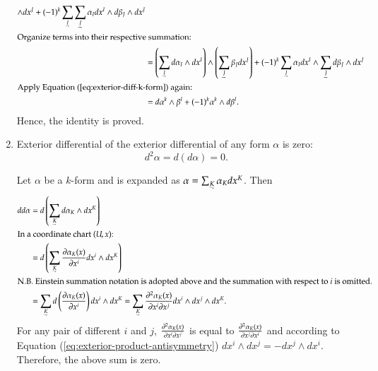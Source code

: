 \documentclass[11pt, a4paper]{book}
\begin{document}
\begin{enumerate}
\begin{Proof}
\begin{align*}
        \wedge dx^J + (-1)^k\sum_{\underaccent{\rightharpoondown}{I}}
        \sum_{\underaccent{\rightharpoondown}{J}} \alpha_Idx^I \wedge d\beta_J \wedge dx^J
      \\
      \intertext{Organize terms into their respective summation:}
      &= \left( \sum_{\underaccent{\rightharpoondown}{I}} d\alpha_I \wedge dx^I \right)
        \wedge \left( \sum_{\underaccent{\rightharpoondown}{J}} \beta_J dx^J \right) +
        (-1)^k \sum_{\underaccent{\rightharpoondown}{I}} \alpha_Idx^I \wedge
        \sum_{\underaccent{\rightharpoondown}{J}} d\beta_{J} \wedge dx^J \\
      \intertext{Apply Equation (\ref{eq:exterior-diff-k-form}) again:}
      &= d\alpha^k \wedge \beta^l + (-1)^k \alpha^k \wedge d\beta^l.
    \end{align*}
    Hence, the identity is proved.
  \end{Proof}
\item Exterior differential of the exterior differential of any form $\alpha$ is
  zero:
  \begin{equation}
    d^2\alpha = d(d\alpha) = 0.
  \end{equation}
  \begin{Proof}
    Let $\alpha$ be a $k$-form and is expanded as $\alpha =
    \sum_{\underaccent{\rightharpoondown}{K}} \alpha_K dx^K$. Then
    \begin{align*}
      dd\alpha &=
                 d \left( \sum_{\underaccent{\rightharpoondown}{K}} d\alpha_K \wedge dx^K
                 \right) \\
      \intertext{In a coordinate chart $(U,x)$:}
               &= d \left( \sum_{\underaccent{\rightharpoondown}{K}} \frac{\pdiff
                 \alpha_{K}(x)}{\pdiff x^i} dx^i \wedge dx^K \right) \\
      \intertext{N.B. Einstein summation notation is adopted above and the summation with respect to $i$ is
      omitted.}
               &= \sum_{\underaccent{\rightharpoondown}{K}} d \left( \frac{\pdiff
                 \alpha_K(x)}{\pdiff x^i} \right) dx^i \wedge dx^K =
                 \sum_{\underaccent{\rightharpoondown}{K}} \frac{\pdiff^2 \alpha_K(x)}{\pdiff x^i
                 \pdiff x^j} dx^i \wedge dx^j \wedge dx^K. \\
    \end{align*}
    For any pair of different $i$ and $j$,
    $\frac{\partial^2 \alpha_K(x)}{\partial x^i \partial x^j}$ is equal to
    $\frac{\partial^2 \alpha_K(x)}{\partial x^j \partial x^i}$ and according to Equation
    (\ref{eq:exterior-product-antisymmetry}) $dx^i \wedge dx^j = -dx^j \wedge dx^i$.
    Therefore, the above sum is zero.
  \end{Proof}
\end{enumerate}
\end{document}
